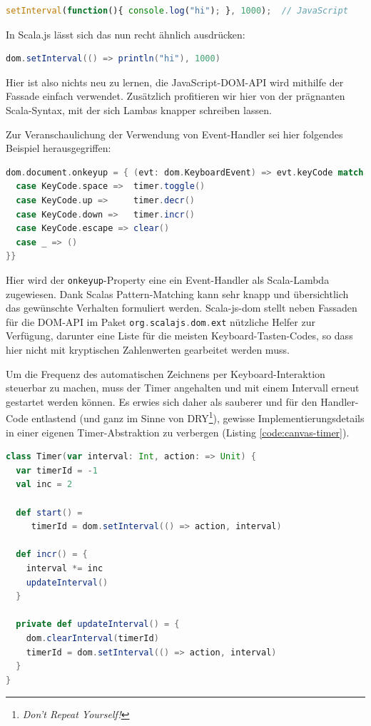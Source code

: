 \documentclass[a4paper, 12pt, hidelinks, listof=totoc, listoftables=totoc, bibliography=totoc]{scrreprt}
\newcommand{\scala}[1]{\lstinline[language=Scala, style=inline]|#1|}
\begin{document}
\begin{lstlisting}[language=JavaScript, style=snippet]
setInterval(function(){ console.log("hi"); }, 1000);  // JavaScript
\end{lstlisting}

In Scala.js lässt sich das nun recht ähnlich ausdrücken:

\begin{lstlisting}[language=Scala, style=snippet]
dom.setInterval(() => println("hi"), 1000)
\end{lstlisting}

Hier ist also nichts neu zu lernen, die JavaScript-DOM-API wird mithilfe der Fassade einfach verwendet. Zusätzlich profitieren wir hier von der prägnanten Scala-Syntax, mit der sich Lambas knapper schreiben lassen.

Zur Veranschaulichung der Verwendung von Event-Handler sei hier folgendes Beispiel herausgegriffen:

\begin{lstlisting}[language=Scala, style=snippet]
dom.document.onkeyup = { (evt: dom.KeyboardEvent) => evt.keyCode match {
  case KeyCode.space =>  timer.toggle()
  case KeyCode.up =>     timer.decr()
  case KeyCode.down =>   timer.incr()
  case KeyCode.escape => clear()
  case _ => ()
}}
\end{lstlisting}

Hier wird der \scala{onkeyup}-Property eine ein Event-Handler als Scala-Lambda zugewiesen. Dank Scalas Pattern-Matching kann sehr knapp und übersichtlich das gewünschte Verhalten formuliert werden. Scala-js-dom stellt neben Fassaden für die DOM-API im Paket \scala{org.scalajs.dom.ext} nützliche Helfer zur Verfügung, darunter eine Liste für die meisten Keyboard-Tasten-Codes, so dass hier nicht mit kryptischen Zahlenwerten gearbeitet werden muss.

Um die Frequenz des automatischen Zeichnens per Keyboard-Interaktion steuerbar zu machen, muss der Timer angehalten und mit einem Intervall erneut gestartet werden können. Es erwies sich daher als sauberer und für den Handler-Code entlastend (und ganz im Sinne von DRY\footnote{\textit{Don't Repeat Yourself!}}), gewisse Implementierungsdetails in einer eigenen Timer-Abstraktion zu verbergen (Listing \ref{code:canvas-timer}).
		
\begin{lstlisting}[language=Scala, caption={Timer-Klasse des Canvas-Beispiels.}, label={code:canvas-timer}]
class Timer(var interval: Int, action: => Unit) {
  var timerId = -1
  val inc = 2

  def start() =
     timerId = dom.setInterval(() => action, interval)
   
  def incr() = {
    interval *= inc
    updateInterval()
  }

  private def updateInterval() = {
    dom.clearInterval(timerId)
    timerId = dom.setInterval(() => action, interval)
  }
}
\end{lstlisting}
\end{document}
